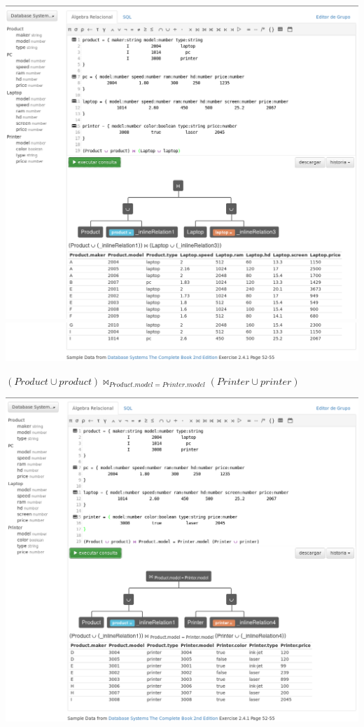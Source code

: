 \documentclass[12pt, letterpaper]{article}
\begin{document}
\begin{itemize}
\begin{itemize}
\begin{center}
                                        \includegraphics[scale=0.24]{q3.png}
                                        \includegraphics[scale=0.24]{q33.png}
                                    \end{center}

                                    \begin{center}
                                        $(Product \cup product) \Join_{Product.model=Printer.model} (Printer \cup printer)$\vspace{.3cm}

                                        \includegraphics[scale=0.24]{q4.png}
                                    \end{center}


\end{itemize}
\end{itemize}
\end{document}
